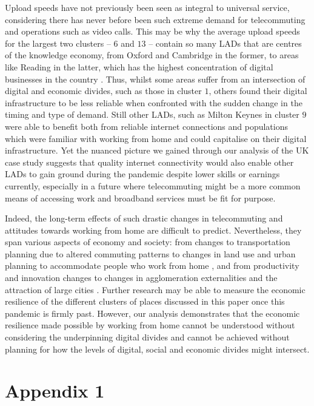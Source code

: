 \documentclass[Royal,times,sageh]{sagej}
\begin{document}
Upload speeds have not previously been seen as integral to universal
service, considering there has never before been such extreme demand for
telecommuting and operations such as video calls. This may be why the
average upload speeds for the largest two clusters -- \(6\) and \(13\)
-- contain so many LADs that are centres of the knowledge economy, from
Oxford and Cambridge in the former, to areas like Reading in the latter,
which has the highest concentration of digital businesses in the country
\citep{technation2017}. Thus, whilst some areas suffer from an
intersection of digital and economic divides, such as those in cluster
\(1\), others found their digital infrastructure to be less reliable
when confronted with the sudden change in the timing and type of demand.
Still other LADs, such as Milton Keynes in cluster \(9\) were able to
benefit both from reliable internet connections and populations which
were familiar with working from home and could capitalise on their
digital infrastructure. Yet the nuanced picture we gained through our
analysis of the UK case study suggests that quality internet
connectivity would also enable other LADs to gain ground during the
pandemic despite lower skills or earnings currently, especially in a
future where telecommuting might be a more common means of accessing
work and broadband services must be fit for purpose.

Indeed, the long-term effects of such drastic changes in telecommuting
and attitudes towards working from home are difficult to predict.
Nevertheless, they span various aspects of economy and society: from
changes to transportation planning due to altered commuting patterns to
changes in land use and urban planning to accommodate people who work
from home \citep{BUDNITZ2020102713, ELLDER2020102777}, and from
productivity and innovation changes to changes in agglomeration
externalities and the attraction of large cities \citep{econobs}.
Further research may be able to measure the economic resilience of the
different clusters of places discussed in this paper once this pandemic
is firmly past. However, our analysis demonstrates that the economic
resilience made possible by working from home cannot be understood
without considering the underpinning digital divides and cannot be
achieved without planning for how the levels of digital, social and
economic divides might intersect.

\hypertarget{appendix1}{%
\section{Appendix 1}\label{appendix1}}
\end{document}
